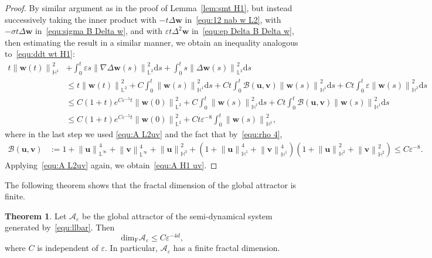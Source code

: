 \documentclass[11pt, reqno]{amsart}
\theoremstyle{definition}
\newtheorem{theorem}{Theorem}[section]
\numberwithin{equation}{section}
\newcommand{\bff}{\boldsymbol}
\newcommand{\bb}{\mathbb}
\newcommand{\ds}{\mathrm{d}s}
\newcommand{\norm}[2]{\left\|{#1}\right\|_{#2}}
\begin{document}
\begin{proof}
By similar argument as in the proof of Lemma~\ref{lem:smt H1}, but instead successively taking the inner product with $-t\Delta \bff{w}$ in~\eqref{equ:12 nab w L2}, with $-\sigma t\Delta \bff{w}$ in~\eqref{equ:sigma B Delta w}, and with $\varepsilon t \Delta^2 \bff{w}$ in~\eqref{equ:ep Delta B Delta w}, then estimating the result in a similar manner, we obtain an inequality analogous to~\eqref{equ:ddt wt H1}:
\begin{align*}
    t \norm{\bff{w}(t)}{\bb{H}^1}^2
    &+
    \int_0^t \varepsilon s \norm{\nabla \Delta \bff{w}(s)}{\bb{L}^2}^2 \ds
    +
    \int_0^t s \norm{\Delta \bff{w}(s)}{\bb{L}^2}^2 \ds 
    \\
    &\leq
    t \norm{\bff{w}(t)}{\bb{L}^2}^2
    +
    C\int_0^t \norm{\bff{w}(s)}{\bb{H}^1}^2 \ds 
    +
    Ct\int_0^t \mathcal{B}(\bff{u},\bff{v}) \norm{\bff{w}(s)}{\bb{H}^1}^2 \ds
    +
    Ct \int_0^t \varepsilon \norm{\bff{w}(s)}{\bb{H}^2}^2 \ds
    \\
    &\leq
    C(1+t) e^{C\varepsilon^{-5}t} \norm{\bff{w}(0)}{\bb{L}^2}^2
    +
    C\int_0^t \norm{\bff{w}(s)}{\bb{H}^1}^2 \ds 
    +
    Ct\int_0^t \mathcal{B}(\bff{u},\bff{v}) \norm{\bff{w}(s)}{\bb{H}^1}^2 \ds
    \\
    &\leq
    C(1+t)e^{C\varepsilon^{-5}t} \norm{\bff{w}(0)}{\bb{L}^2}^2
    +
    Ct\varepsilon^{-8} \int_0^t \norm{\bff{w}(s)}{\bb{H}^1}^2,
\end{align*}
where in the last step we used \eqref{equ:A L2uv} and the fact that by~\eqref{equ:rho 4},
\begin{align*}
    \mathcal{B}(\bff{u},\bff{v})
    &:= 
    1+ \norm{\bff{u}}{\bb{L}^\infty}^4 + \norm{\bff{v}}{\bb{L}^\infty}^4
    +
    \norm{\bff{u}}{\bb{H}^3}^2 
    + 
    \left(1+ \norm{\bff{u}}{\bb{H}^1}^4 + \norm{\bff{v}}{\bb{H}^1}^4 \right) \left(1+\norm{\bff{u}}{\bb{H}^2}^2 + \norm{\bff{v}}{\bb{H}^2}^2 \right)
    \leq
    C\varepsilon^{-8}.
\end{align*}
Applying~\eqref{equ:A L2uv} again, we obtain~\eqref{equ:A H1 uv}.
\end{proof}

The following theorem shows that the fractal dimension of the global attractor is finite.

\begin{theorem}\label{the:dim}
Let $\mathcal{A}_\varepsilon$ be the global attractor of the semi-dynamical system generated by~\eqref{equ:llbar}. Then
\[
    \text{dim}_{\mathrm{F}} \mathcal{A}_\varepsilon \leq C\varepsilon^{-4d},
\]
where $C$ is independent of $\varepsilon$.
In particular, $\mathcal{A}_\varepsilon$ has a finite fractal dimension.
\end{theorem}
\end{document}
